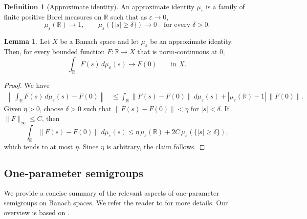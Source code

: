 \documentclass[11pt,a4paper]{article}
\theoremstyle{plain}
\numberwithin{theorem}{section}
\theoremstyle{definition}
\newtheorem{definition}[theorem]{Definition}
\newtheorem{lemma}[theorem]{Lemma}
\newcommand{\?}{\overset{?}{=}}
\newcommand{\ve}{\varepsilon}
\begin{document}
\begin{appendix}
\begin{definition}[Approximate identity]\label{def:approx-id}
An approximate identity \(\mu_\varepsilon\) is a family of finite positive Borel measures on \(\mathbb R\) such that as $\ve\to0$,
\[
        \mu_\varepsilon(\mathbb R)\to 1,
        \qquad
        \mu_\varepsilon(\{|s|\geq \delta\})\to 0
        \quad\text{for every }\delta>0 .
\]
\end{definition}
\begin{lemma}\label{lem:approx-id}
Let \(X\) be a Banach space and let $\mu_\ve$ be an approximate identity. Then, for every bounded function \(F:\mathbb R\to X\) that is norm-continuous
at \(0\),
\[
        \int_{\mathbb R}F(s)\,d\mu_\varepsilon(s)
        \longrightarrow F(0)
        \qquad\text{in }X .
\]
\end{lemma}
\begin{proof}
We have
\[
\begin{aligned}
\left\|
        \int_{\mathbb R}F(s)\,d\mu_\varepsilon(s)-F(0)
\right\|
&\leq
        \int_{\mathbb R}\|F(s)-F(0)\|\,d\mu_\varepsilon(s)
        +
        |\mu_\varepsilon(\mathbb R)-1|\,\|F(0)\| .
\end{aligned}
\]
Given \(\eta>0\), choose \(\delta>0\) such that
\(\|F(s)-F(0)\|<\eta\) for \(|s|<\delta\).  If
\(\|F\|_\infty\leq C\), then
\[
        \int_{\mathbb R}\|F(s)-F(0)\|\,d\mu_\varepsilon(s)
        \leq
        \eta\,\mu_\varepsilon(\mathbb R)
        +
        2C\,\mu_\varepsilon(\{|s|\geq\delta\}),
\]
which tends to at most \(\eta\).  Since \(\eta\) is arbitrary, the claim
follows.
\end{proof}

\subsection{One-parameter semigroups}\label{appsubsec:semigrp}
We provide a concise summary of the relevant aspects of one-parameter semigroups on Banach spaces. We refer the reader to \cite{engel.nagel:00:one-parameter,arendt.batty.ea:11:vector-valued,hille1981functional} for more details. Our overview is based on \cite{engel.nagel:00:one-parameter}.


\end{appendix}
\end{document}
